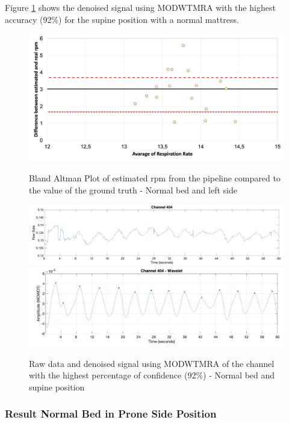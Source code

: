 Figure \ref{fig:rec} shows the denoised signal using MODWTMRA with the highest accuracy (92\%) for the supine position with a normal mattress.

\begin{figure}[p]
  \centering
  \includegraphics[width=\textwidth]{img/balnd2.png}

  \caption{Bland Altman Plot of estimated rpm from the pipeline compared to the value of the ground truth - Normal bed and left side}
  \label{fig:baln2}
  \vspace{1.5cm}
  \includegraphics[width=\textwidth]{img/404.jpg}
  \includegraphics[width=\textwidth]{img/404_wave.jpg}
\caption{Raw data and denoised signal using MODWTMRA of the channel with the highest percentage of confidence (92\%) - Normal bed and supine position}
  \label{fig:rec}
\end{figure}


\clearpage
\subsubsection{Result Normal Bed in Prone Side Position}   \label{cap:ResultNormalBed3}

